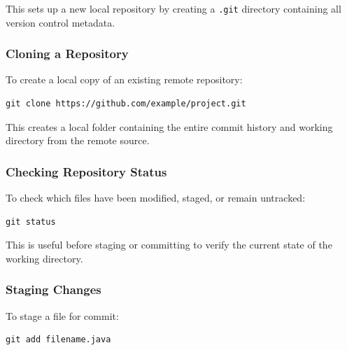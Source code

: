 \documentclass{article}
\newcommand{\codecmd}[1]{\textcolor[rgb]{0,0.5,0}{\texttt{#1}}}
\begin{document}
\noindent This sets up a new local repository by creating a \codecmd{.git} directory containing all version control metadata.

\subsubsection{Cloning a Repository}

To create a local copy of an existing remote repository:

\begin{tcolorbox}[colback=mintgreen, colframe=green!40!black, boxrule=0.5pt, sharp corners]
\begin{verbatim}
git clone https://github.com/example/project.git
\end{verbatim}
\end{tcolorbox}

\noindent This creates a local folder containing the entire commit history and working directory from the remote source.

\subsubsection{Checking Repository Status}

To check which files have been modified, staged, or remain untracked:

\begin{tcolorbox}[colback=mintgreen, colframe=green!40!black, boxrule=0.5pt, sharp corners]
\begin{verbatim}
git status
\end{verbatim}
\end{tcolorbox}

\noindent This is useful before staging or committing to verify the current state of the working directory.

\subsubsection{Staging Changes}

To stage a file for commit:

\begin{tcolorbox}[colback=mintgreen, colframe=green!40!black, boxrule=0.5pt, sharp corners]
\begin{verbatim}
git add filename.java
\end{verbatim}
\end{tcolorbox}
\end{document}
